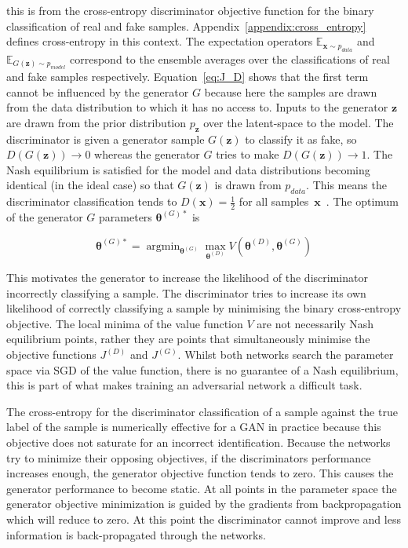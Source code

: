 \documentclass[twocolumn]{article}
\DeclareMathOperator*{\argmin}{\text{argmin}}
\numberwithin{equation}{section}
\begin{document}
this is from the cross-entropy discriminator objective function for the binary classification of real and fake 
samples. Appendix~\ref{appendix:cross_entropy} defines cross-entropy in this context. The expectation operators 
$\mathbb{E}_{\mathbf{x} \sim p_{data}}$ and $\mathbb{E}_{G(\mathbf{z}) \sim p_{model}}$ correspond to the ensemble 
averages over the classifications of real and fake samples respectively. Equation~\ref{eq:J_D} shows that the first 
term cannot be influenced by the generator $G$ because here the samples are drawn from the data distribution to which 
it has no access to. Inputs to the generator $\mathbf{z}$ are drawn from the prior distribution $p_\mathbf{z}$ over 
the latent-space to the model. The discriminator is given a generator sample $G(\mathbf{z})$ to classify it as fake, 
so $D(G(\mathbf{z})) \! \rightarrow \! 0$ whereas the generator $G$ tries to make $D(G(\mathbf{z})) \!  \rightarrow \! 1$. 
The Nash equilibrium is satisfied for the model and data distributions becoming identical (in the ideal case) so that 
$G(\mathbf{z})$ is drawn from $p_{data}$. This means the discriminator classification tends to $D(\mathbf{x}) = 
\frac{1}{2}$ for all samples~$\mathbf{x}$~\cite{gf_gan}. The optimum of the generator $G$ parameters 
$\bm{\theta}^{(G)*}$ is 

\begin{equation}
    \bm{\theta}^{(G)*} = \argmin_{\mathbf{\theta}^{(G)}}\max_{\mathbf{\theta}^{(D)}}V({\mathbf{\theta}^{(D)}},{\mathbf{\theta}^{(G)}})
\end{equation}

This motivates the generator to increase the likelihood of the discriminator incorrectly classifying a sample. The 
discriminator tries to increase its own likelihood of correctly classifying a sample by minimising the binary 
cross-entropy objective. The local minima of the value function $V$ are not necessarily Nash equilibrium points, rather
they are points that simultaneously minimise the objective functions $J^{(D)}$ and $J^{(G)}$. Whilst both networks search 
the parameter space via SGD of the value function, there is no guarantee of a Nash equilibrium, this is part of what makes 
training an adversarial network a difficult task.

The cross-entropy for the discriminator classification of a sample against the true label of the sample is numerically 
effective for a GAN in practice because this objective does not saturate for an incorrect identification. Because the 
networks try to minimize their opposing objectives, if the discriminators performance increases enough, the generator 
objective function tends to zero. This causes the generator performance to become static. At all points in the parameter 
space the generator objective minimization is guided by the gradients from backpropagation which will reduce to zero. At 
this point the discriminator cannot improve and less information is back-propagated through the networks.
\end{document}
